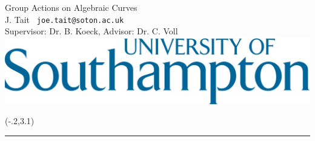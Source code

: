 \documentclass[a1,portrait]{a0poster}
\begin{document}





\begin{minipage}[c][9cm][c]{\textwidth}
  \begin{center}
    {\sc \Huge Group Actions on Algebraic Curves}\\[10mm]
    {\large J. Tait \texttt{ joe.tait@soton.ac.uk}\\[7.5mm]
     \large Supervisor: Dr. B. Koeck, Advisor: Dr. C. Voll\\[7.5mm]}  
     \includegraphics[scale=0.2]{./soton.jpeg}   
     \end{center}
\end{minipage}


\begin{textblock}{17.4}(-.2,3.1)
\rule{17.4\TPHorizModule}{1.8mm}
\end{textblock}

\sloppy


\end{document}
